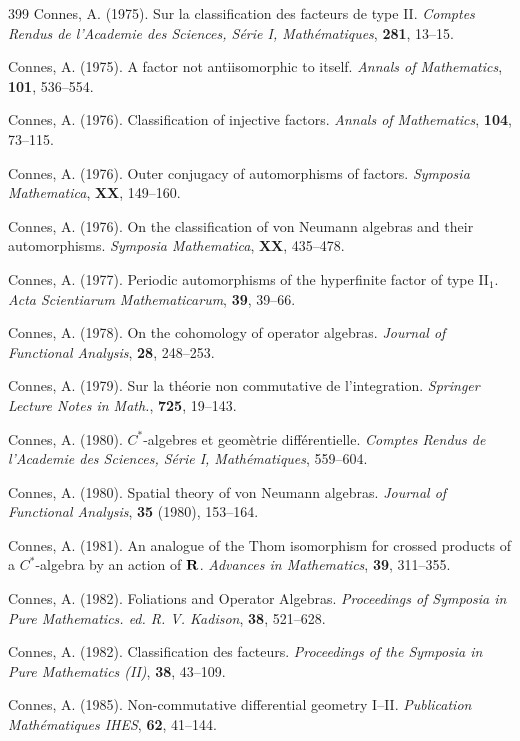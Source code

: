 \documentclass[12pt]{article}
\theoremstyle{plain}
\theoremstyle{definition}
\numberwithin{equation}{section}
\begin{document}
\begin{thebibliography} {399}
Connes, A. (1975).
Sur la classification des facteurs de type II.
{\em Comptes Rendus de l'Academie des Sciences, 
S\'erie I, Math\'ematiques}, {\bf 281},  13--15.

Connes, A. (1975).
A factor not antiisomorphic to itself.
{\em Annals of Mathematics}, {\bf 101},  536--554.

Connes, A. (1976).
Classification of injective factors.
{\em Annals of Mathematics},
{\bf 104}, 73--115.

Connes, A. (1976).
Outer conjugacy of automorphisms of factors.
{\em Symposia Mathematica}, {\bf XX}, 149--160.

Connes, A. (1976).
On the classification of von Neumann
algebras and their automorphisms.
{\em Symposia Mathematica}, {\bf XX}, 435--478.

Connes, A. (1977).
Periodic automorphisms of the hyperfinite factor of type II$_1$. 
{\em Acta Scientiarum Mathematicarum},
{\bf 39},  39--66.

Connes, A. (1978).
On the cohomology of operator algebras.
{\em Journal of Functional Analysis},
{\bf 28}, 248--253.

Connes, A. (1979).
Sur la th\'eorie non commutative de l'integration.
{\em Springer Lecture Notes in Math.},
{\bf 725}, 19--143.

Connes, A. (1980).
$C^*$-algebres et geom\`etrie diff\'erentielle.
{\em Comptes Rendus de l'Academie des Sciences,
S\'erie I, Math\'ematiques},
559--604.

Connes, A. (1980).
Spatial theory of von Neumann algebras.
{\em Journal of Functional Analysis}, {\bf 35} 
(1980), 153--164.

Connes, A. (1981).
An analogue of the Thom isomorphism for crossed 
products of a $C^*$-algebra by an action of
${\bf R}$. {\em Advances in Mathematics},
{\bf 39}, 311--355.

Connes, A. (1982).
Foliations and Operator Algebras.
{\em Proceedings of Symposia in Pure Mathematics. 
ed.  R. V. Kadison},
{\bf 38}, 521--628.

Connes, A. (1982).
Classification des facteurs.
{\em Proceedings of the Symposia in Pure Mathematics (II)},
{\bf 38}, 43--109.

Connes, A. (1985).
Non-commutative differential geometry I--II.
{\em Publication Math\'ematiques IHES},
{\bf 62}, 41--144.


\end{thebibliography}
\end{document}
